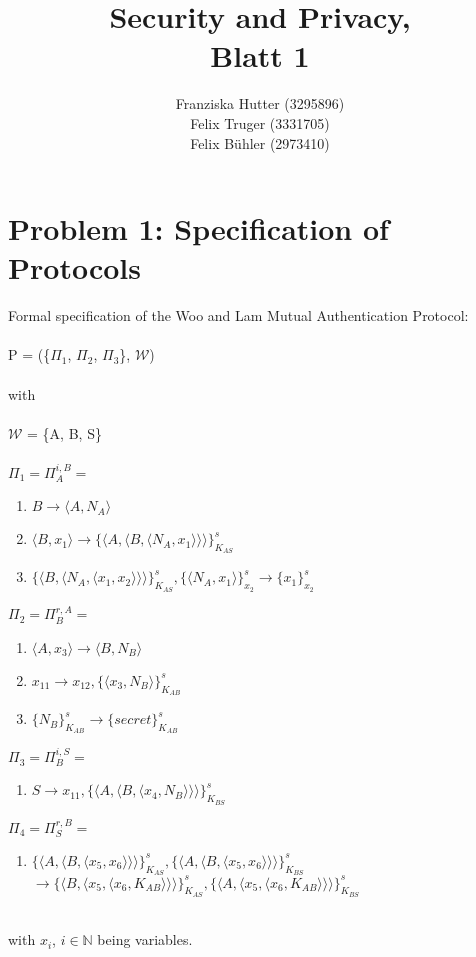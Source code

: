 \documentclass[12pt,pdftex,a4paper]{article}
\title{Security and Privacy,\\ Blatt 1}
\author{Franziska Hutter (3295896)\\
	Felix Truger (3331705)\\
	Felix Bühler (2973410)}
\newcommand\tab[1][1cm]{\hspace*{#1}}
\begin{document}
\maketitle
\pagebreak

\section*{Problem 1: Specification of Protocols}
Formal specification of the Woo and Lam Mutual Authentication Protocol:
\\~\\
P = (\{$\Pi_1$, $\Pi_2$, $\Pi_3$\}, $\mathcal{W}$)\\~\\
with\\~\\
$\mathcal{W}$ = \{A, B, S\}\\~\\

$\Pi_1 = \Pi_A^{i,B} =$
\begin{enumerate}
	\item \tab $ B \rightarrow \langle A, N_A\rangle $
	\item \tab $ \langle B, x_1 \rangle \rightarrow \{\langle A, \langle B, \langle N_A, x_1\rangle\rangle\rangle\}_{K_{AS}}^s$	
	\item \tab $ \{\langle B,\langle N_A, \langle x_1, x_2\rangle\rangle\rangle\}_{K_{AS}}^{s}, \{\langle N_A, x_1\rangle\}_{x_2}^s \rightarrow \{x_1\}_{x_2}^s $
\end{enumerate} 

$\Pi_2 = \Pi_B^{r,A} =$
\begin{enumerate}
\item \tab $\langle A, x_3\rangle \rightarrow \langle B, N_B \rangle$
\item \tab $x_{11} \rightarrow x_{12}, \{\langle x_3, N_B\rangle\}_{K_{AB}}^s$
\item \tab $ \{N_B\}_{K_{AB}}^s \rightarrow \{secret\}_{K_{AB}}^s$
\end{enumerate}

$\Pi_3 = \Pi_B^{i,S} =$
\begin{enumerate}
\item \tab $ S \rightarrow x_{11}, \{\langle A, \langle B, \langle x_4, N_B \rangle\rangle\rangle\}_{K_{BS}}^s $
\end{enumerate}

$\Pi_4 = \Pi_S^{r,B} =$
\begin{enumerate}
\item \tab $ \{\langle A, \langle B, \langle x_5, x_6\rangle\rangle\rangle\}_{K_{AS}}^s, \{\langle A, \langle B, \langle x_5, x_6\rangle\rangle\rangle\}_{K_{BS}}^s $ \\ \tab $\rightarrow \{\langle B, \langle x_5, \langle x_6, K_{AB}\rangle\rangle\rangle\}_{K_{AS}}^s,\{\langle A, \langle x_5, \langle x_6, K_{AB}\rangle\rangle\rangle\}_{K_{BS}}^s $
\end{enumerate}\
\\
with $x_i$, $i\in\mathbb{N}$ being variables.
\end{document}
